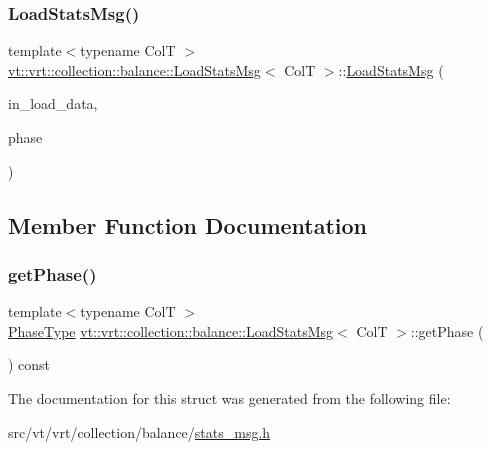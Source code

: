\subsubsection{\texorpdfstring{Load\+Stats\+Msg()}{LoadStatsMsg()}\hspace{0.1cm}{\footnotesize\ttfamily [2/2]}}
{\footnotesize\ttfamily template$<$typename ColT $>$ \\
\hyperlink{structvt_1_1vrt_1_1collection_1_1balance_1_1_load_stats_msg}{vt\+::vrt\+::collection\+::balance\+::\+Load\+Stats\+Msg}$<$ ColT $>$\+::\hyperlink{structvt_1_1vrt_1_1collection_1_1balance_1_1_load_stats_msg}{Load\+Stats\+Msg} (\begin{DoxyParamCaption}\item[{\hyperlink{structvt_1_1vrt_1_1collection_1_1balance_1_1_load_data}{Load\+Data} const \&}]{in\+\_\+load\+\_\+data,  }\item[{\hyperlink{namespacevt_a46ce6733d5cdbd735d561b7b4029f6d7}{Phase\+Type} const \&}]{phase }\end{DoxyParamCaption})\hspace{0.3cm}{\ttfamily [inline]}}



\subsection{Member Function Documentation}
\mbox{\label{structvt_1_1vrt_1_1collection_1_1balance_1_1_load_stats_msg_acfce435d77d32952996e334701fe28ed}} 
\subsubsection{\texorpdfstring{get\+Phase()}{getPhase()}}
{\footnotesize\ttfamily template$<$typename ColT $>$ \\
\hyperlink{namespacevt_a46ce6733d5cdbd735d561b7b4029f6d7}{Phase\+Type} \hyperlink{structvt_1_1vrt_1_1collection_1_1balance_1_1_load_stats_msg}{vt\+::vrt\+::collection\+::balance\+::\+Load\+Stats\+Msg}$<$ ColT $>$\+::get\+Phase (\begin{DoxyParamCaption}{ }\end{DoxyParamCaption}) const\hspace{0.3cm}{\ttfamily [inline]}}



The documentation for this struct was generated from the following file\+:\begin{DoxyCompactItemize}
\item 
src/vt/vrt/collection/balance/\hyperlink{stats__msg_8h}{stats\+\_\+msg.\+h}\end{DoxyCompactItemize}
